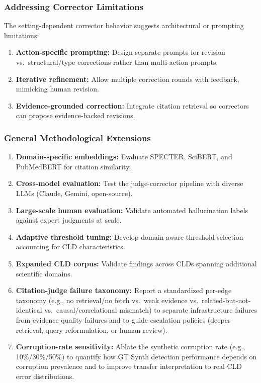 \subsubsection{Addressing Corrector Limitations}

The setting-dependent corrector behavior suggests architectural or prompting limitations:
\begin{enumerate}[noitemsep]
    \item \textbf{Action-specific prompting:} Design separate prompts for revision vs.\ structural/type corrections rather than multi-action prompts.
    \item \textbf{Iterative refinement:} Allow multiple correction rounds with feedback, mimicking human revision.
    \item \textbf{Evidence-grounded correction:} Integrate citation retrieval so correctors can propose evidence-backed revisions.
\end{enumerate}

\subsubsection{General Methodological Extensions}

\begin{enumerate}[noitemsep]
    \item \textbf{Domain-specific embeddings:} Evaluate SPECTER, SciBERT, and PubMedBERT for citation similarity.
    \item \textbf{Cross-model evaluation:} Test the judge-corrector pipeline with diverse LLMs (Claude, Gemini, open-source).
    \item \textbf{Large-scale human evaluation:} Validate automated hallucination labels against expert judgments at scale.
    \item \textbf{Adaptive threshold tuning:} Develop domain-aware threshold selection accounting for CLD characteristics.
    \item \textbf{Expanded CLD corpus:} Validate findings across CLDs spanning additional scientific domains.
    \item \textbf{Citation-judge failure taxonomy:} Report a standardized per-edge taxonomy (e.g., no retrieval/no fetch vs.\ weak evidence vs.\ related-but-not-identical vs.\ causal/correlational mismatch) to separate infrastructure failures from evidence-quality failures and to guide escalation policies (deeper retrieval, query reformulation, or human review).
    \item \textbf{Corruption-rate sensitivity:} Ablate the synthetic corruption rate (e.g., 10\%/30\%/50\%) to quantify how GT Synth detection performance depends on corruption prevalence and to improve transfer interpretation to real CLD error distributions.
\end{enumerate}

